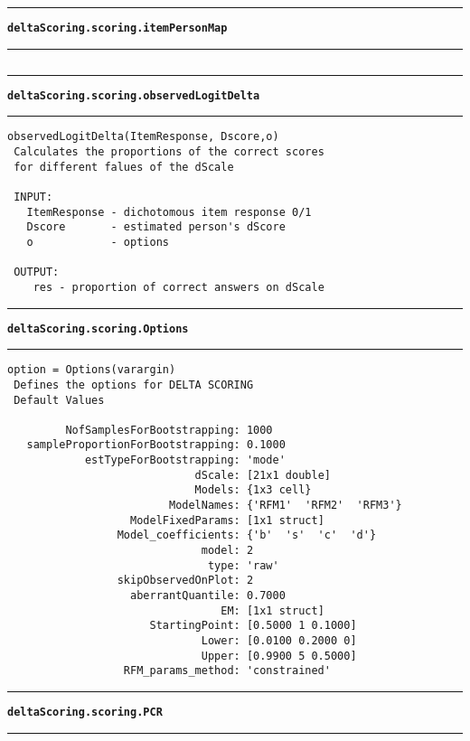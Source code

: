 \par\noindent\rule{\textwidth}{0.4pt}
{\bf\tt deltaScoring.scoring.itemPersonMap}
\par\noindent\rule{\textwidth}{0.4pt}
\begin{lstlisting}[style=Matlab-bw]
\end{lstlisting}
\par\noindent\rule{\textwidth}{0.4pt}
{\bf\tt deltaScoring.scoring.observedLogitDelta}
\par\noindent\rule{\textwidth}{0.4pt}
\begin{lstlisting}[style=Matlab-bw]
 observedLogitDelta(ItemResponse, Dscore,o)
 Calculates the proportions of the correct scores
 for different falues of the dScale

 INPUT:
   ItemResponse - dichotomous item response 0/1
   Dscore       - estimated person's dScore
   o            - options
                
 OUTPUT: 
 	res - proportion of correct answers on dScale
\end{lstlisting}
\par\noindent\rule{\textwidth}{0.4pt}
{\bf\tt deltaScoring.scoring.Options}
\par\noindent\rule{\textwidth}{0.4pt}
\begin{lstlisting}[style=Matlab-bw]
 option = Options(varargin)
 Defines the options for DELTA SCORING
 Default Values

         NofSamplesForBootstrapping: 1000
   sampleProportionForBootstrapping: 0.1000
            estTypeForBootstrapping: 'mode'
                             dScale: [21x1 double]
                             Models: {1x3 cell}
                         ModelNames: {'RFM1'  'RFM2'  'RFM3'}
                   ModelFixedParams: [1x1 struct]
                 Model_coefficients: {'b'  's'  'c'  'd'}
                              model: 2
                               type: 'raw'
                 skipObservedOnPlot: 2
                   aberrantQuantile: 0.7000
                                 EM: [1x1 struct]
                      StartingPoint: [0.5000 1 0.1000]
                              Lower: [0.0100 0.2000 0]
                              Upper: [0.9900 5 0.5000]
                  RFM_params_method: 'constrained'
\end{lstlisting}
\par\noindent\rule{\textwidth}{0.4pt}
{\bf\tt deltaScoring.scoring.PCR}
\par\noindent\rule{\textwidth}{0.4pt}

